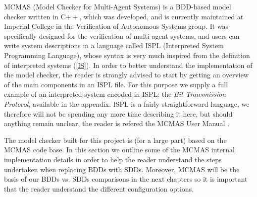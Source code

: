 \documentclass[11pt]{article}
\begin{document}
MCMAS (Model Checker for Multi-Agent Systems) is a BDD-based model checker written in C$++$, which was developed, and is currently maintained at Imperial College in the Verification of Autonomous Systems group. It was specifically designed for the verification of multi-agent systems, and users can write system descriptions in a language called ISPL (Interpreted System Programming Language), whose syntax is very much inspired from the definition of interpreted systems (\ref{IS}). In order to better understand the implementation of the model checker, the reader is strongly advised to start by getting an overview of the main components in an ISPL file. For this purpose we supply a full example of an interpreted system encoded in ISPL: the \textit{Bit Transmission Protocol}, available in the appendix. ISPL is a fairly straightforward language, we therefore will not be spending any more time describing it here, but should anything remain unclear, the reader is refered the MCMAS User Manual \cite{mcmas}.



The model checker built for this project is (for a large part) based on the MCMAS code base. In this section we outline some of the MCMAS internal implementation details in order to help the reader understand the steps undertaken when replacing BDDs with SDDs. Moreover, MCMAS will be the basis of our BDDs vs. SDDs comparisons in the next chapters so it is important that the reader understand the different configuration options.
\end{document}
